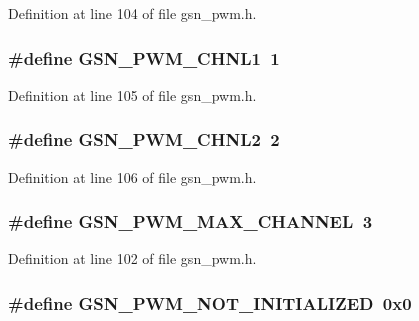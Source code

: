 Definition at line 104 of file gsn\_\-pwm.h.

\hypertarget{a00540_a3a03545733cc892b722dc8344e6ecdcc}{
\subsubsection[{GSN\_\-PWM\_\-CHNL1}]{\setlength{\rightskip}{0pt plus 5cm}\#define GSN\_\-PWM\_\-CHNL1~1}}
\label{a00540_a3a03545733cc892b722dc8344e6ecdcc}


Definition at line 105 of file gsn\_\-pwm.h.

\hypertarget{a00540_a6d9d2d70da4c41d70df246b2e6532348}{
\subsubsection[{GSN\_\-PWM\_\-CHNL2}]{\setlength{\rightskip}{0pt plus 5cm}\#define GSN\_\-PWM\_\-CHNL2~2}}
\label{a00540_a6d9d2d70da4c41d70df246b2e6532348}


Definition at line 106 of file gsn\_\-pwm.h.

\hypertarget{a00540_ac1d538c0ad6a4ce7763e402480772401}{
\subsubsection[{GSN\_\-PWM\_\-MAX\_\-CHANNEL}]{\setlength{\rightskip}{0pt plus 5cm}\#define GSN\_\-PWM\_\-MAX\_\-CHANNEL~3}}
\label{a00540_ac1d538c0ad6a4ce7763e402480772401}


Definition at line 102 of file gsn\_\-pwm.h.

\hypertarget{a00540_ad5f01d5e224e1e2f9999c0367906aca2}{
\subsubsection[{GSN\_\-PWM\_\-NOT\_\-INITIALIZED}]{\setlength{\rightskip}{0pt plus 5cm}\#define GSN\_\-PWM\_\-NOT\_\-INITIALIZED~0x0}}
\label{a00540_ad5f01d5e224e1e2f9999c0367906aca2}


